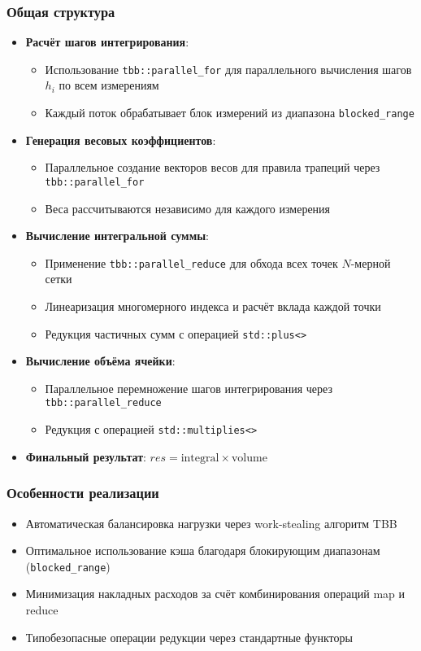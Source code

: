 \documentclass[12pt]{article}
\begin{document}
\subsubsection*{Общая структура}
\begin{itemize}
  \item \textbf{Расчёт шагов интегрирования}:
  \begin{itemize}
    \item Использование \texttt{tbb::parallel\_for} для параллельного вычисления шагов $h_i$ по всем измерениям
    \item Каждый поток обрабатывает блок измерений из диапазона \texttt{blocked\_range}
  \end{itemize}
  
  \item \textbf{Генерация весовых коэффициентов}:
  \begin{itemize}
    \item Параллельное создание векторов весов для правила трапеций через \texttt{tbb::parallel\_for}
    \item Веса рассчитываются независимо для каждого измерения
  \end{itemize}
  
  \item \textbf{Вычисление интегральной суммы}:
  \begin{itemize}
    \item Применение \texttt{tbb::parallel\_reduce} для обхода всех точек $N$-мерной сетки
    \item Линеаризация многомерного индекса и расчёт вклада каждой точки
    \item Редукция частичных сумм с операцией \texttt{std::plus<>}
  \end{itemize}
  
  \item \textbf{Вычисление объёма ячейки}:
  \begin{itemize}
    \item Параллельное перемножение шагов интегрирования через \texttt{tbb::parallel\_reduce}
    \item Редукция с операцией \texttt{std::multiplies<>}
  \end{itemize}
  
  \item \textbf{Финальный результат}: $res = \text{integral} \times \text{volume}$
\end{itemize}

\subsubsection*{Особенности реализации}
\begin{itemize}
  \item Автоматическая балансировка нагрузки через work-stealing алгоритм TBB
  \item Оптимальное использование кэша благодаря блокирующим диапазонам (\texttt{blocked\_range})
  \item Минимизация накладных расходов за счёт комбинирования операций map и reduce
  \item Типобезопасные операции редукции через стандартные функторы
\end{itemize}
\end{document}
